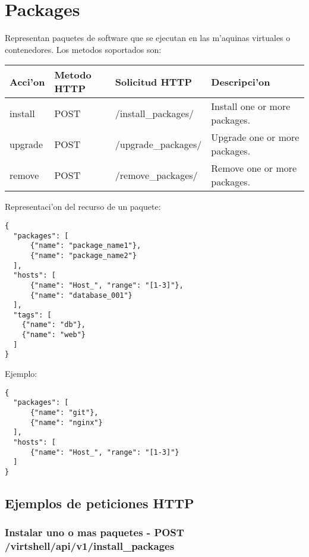 \section{Packages}
Representan paquetes de software que se ejecutan en las m'aquinas virtuales o contenedores. Los metodos soportados son:

\begin{center}
 \begin{tabular}{| l | l | l | l |}
 \hline
  \rowcolor{blueapi}
  \textbf{Acci'on} & \textbf{Metodo HTTP} & \textbf{Solicitud HTTP} & \textbf{Descripci'on} \\ [0.5ex] 
  \hline\hline
  install & POST & /install\_packages/ & Install one or more packages. \\
  \hline
  upgrade & POST & /upgrade\_packages/ & Upgrade one or more packages. \\
  \hline
  remove & POST & /remove\_packages/ & Remove one or more packages. \\ [1ex] 
  \hline
\end{tabular}
\end{center}

\vspace{1cm}
Representaci'on del recurso de un paquete:
\vspace{1cm}

\begin{lstlisting}[style=json]
{
  "packages": [
      {"name": "package_name1"},
      {"name": "package_name2"}
  ],
  "hosts": [ 
      {"name": "Host_", "range": "[1-3]"}, 
      {"name": "database_001"}
  ],
  "tags": [
    {"name": "db"},
    {"name": "web"}
  ]
}
\end{lstlisting}

Ejemplo:

\medskip
\begin{lstlisting}[style=json]
{
  "packages": [
      {"name": "git"},
      {"name": "nginx"}
  ],
  "hosts": [ 
      {"name": "Host_", "range": "[1-3]"}
  ]
}
\end{lstlisting}

\subsection{Ejemplos de peticiones HTTP}

\subsubsection{Instalar uno o mas paquetes - POST /virtshell/api/v1/install\_packages}

